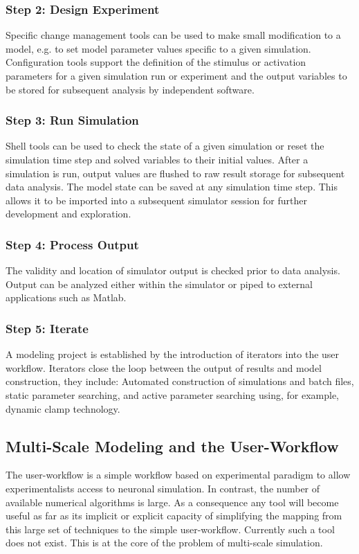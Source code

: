 \documentclass[12pt]{article}
\begin{document}
\subsubsection*{Step 2: Design Experiment}

Specific change management tools can be used to make small
modification to a model, e.g. to set model parameter values specific
to a given simulation.  Configuration tools support the definition of
the stimulus or activation parameters for a given simulation run or
experiment and the output variables to be stored for subsequent
analysis by independent software.

\subsubsection*{Step 3: Run Simulation}

Shell tools can be used to check the state of a given simulation or reset the simulation time step and solved variables to their initial values. After a simulation is run, output values are flushed to raw result storage for subsequent data analysis. The model state can be saved at any simulation time step. This allows it to be imported into a subsequent simulator session for further development and exploration.

\subsubsection*{Step 4: Process Output}

The validity and location of simulator output is checked prior to data
analysis. Output can be analyzed either within the simulator or piped
to external applications such as
Matlab. %

\subsubsection*{Step 5: Iterate}

A modeling project is established by the introduction of iterators
into the user workflow. Iterators close the loop between the output of
results and model construction, they include: Automated construction
of simulations and batch files, static parameter searching, and active
parameter searching using, for example, dynamic clamp technology.


\subsection*{Multi-Scale Modeling and the User-Workflow}
The user-workflow is a simple workflow based on experimental paradigm
to allow experimentalists access to neuronal simulation.  In contrast,
the number of available numerical algorithms is large.  As a
consequence any tool will become useful as far as its implicit or
explicit capacity of simplifying the mapping from this large set of
techniques to the simple user-workflow.  Currently such a tool does
not exist.  This is at the core of the problem of multi-scale
simulation.
\end{document}
